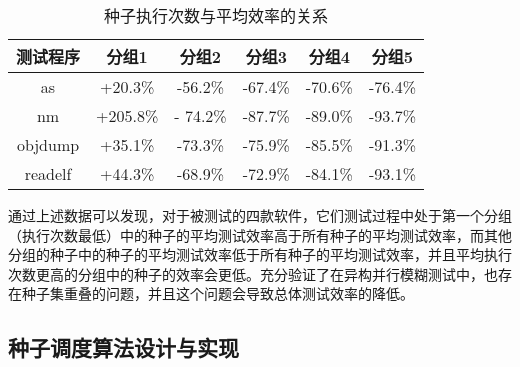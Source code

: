 \documentclass[master]{thesis-uestc}
\begin{document}
\begin{table}[!htbp]
    \caption{种子执行次数与平均效率的关系}
    \begin{tabular}{cccccc}
    \toprule
    测试程序 & 分组1 & 分组2 & 分组3 & 分组4 & 分组5 \\
    \midrule
    as & +20.3\% & -56.2\% & -67.4\% & -70.6\% & -76.4\%  \\
    nm & +205.8\% &- 74.2\% & -87.7\% & -89.0\% & -93.7\%    \\
    objdump & +35.1\% & -73.3\% & -75.9\% & -85.5\% & -91.3\% \\
    readelf & +44.3\% & -68.9\% & -72.9\% & -84.1\% & -93.1\% \\
    \bottomrule
    \end{tabular}
    \label{table_eff}
    \vspace{6pt}
\end{table}

通过上述数据可以发现，对于被测试的四款软件，它们测试过程中处于第一个分组（执行次数最低）中的种子的平均测试效率高于所有种子的平均测试效率，而其他分组的种子中的种子的平均测试效率低于所有种子的平均测试效率，并且平均执行次数更高的分组中的种子的效率会更低。充分验证了在异构并行模糊测试中，也存在种子集重叠的问题，并且这个问题会导致总体测试效率的降低。






\subsection{种子调度算法设计与实现}
\end{document}

